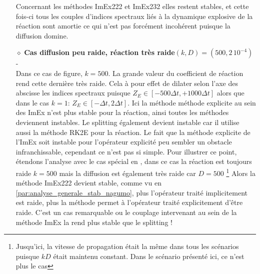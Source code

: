\begin{itemize}
                        Concernant les méthodes ImEx222 et ImEx232 elles restent stables, et cette fois-ci tous les couples d'indices spectraux liés à la 
                        dynamique explosive de la réaction sont amortie ce qui n'est pas forcément incohérent puisque la diffusion domine.
                    \item[$\diamond$]\textbf{Cas diffusion peu raide, réaction très raide$(k,D)=(500,2\, 10^{-4})$} - \\
                        Dans ce cas de figure, $k=500$. La grande valeur du coefficient de réaction rend cette dernière très raide. 
                        Cela à pour effet de dilater selon l'axe des abscisse les indices spectraux puisque $Z_E \in [- 500 \Delta t, + 1000 \Delta t]$
                        alors que dans le cas $k=1$: $Z_E \in [- \Delta t , 2\Delta t]$.
                        Ici la méthode méthode explicite au sein des ImEx n'est plus stable pour la réaction, ainsi toutes les méthodes deviennent instables. 
                        Le splitting également devient instable car il utilise aussi la méthode RK2E pour la réaction. 
                        Le fait que la méthode explicite de l'ImEx soit instable pour l'opérateur explicité peu sembler un obstacle infranchissable,
                        cependant ce n'est pas si simple.
                        Pour illustrer ce point, étendons l'analyse avec le cas spécial en , dans ce cas la réaction est toujours raide $k=500$ mais la diffusion est également très raide car $D=500$
                        \footnote{Jusqu'ici, la vitesse de propagation était la même dans tous les scénarios puisque $kD$ était maintenu constant. Dans le scénario présenté ici, ce n'est plus le cas}
                        Alors la méthode ImEx222 devient stable, comme vu en \ref{par:analyse_generale_stab_nagumo}, plus l'opérateur traité implicitement est raide, 
                        plus la méthode permet à l'opérateur traité explicitement d'être raide. C'est un cas remarquable ou le couplage intervenant au sein de la méthode ImEx
                        la rend plus stable que le splitting !
                \end{itemize}
